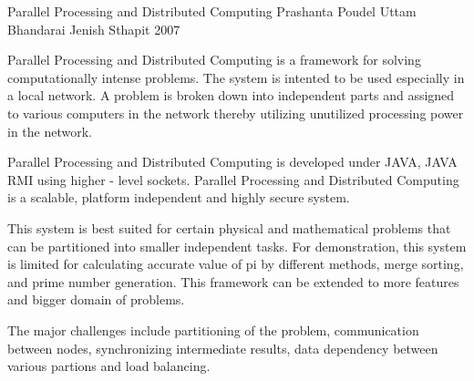  \begin{conf-abstract}[]
{Parallel Processing and Distributed Computing }
{
           Prashanta Poudel
           Uttam Bhandarai
           Jenish Sthapit
}
{ 2007 }

Parallel Processing and Distributed Computing is a framework for solving computationally intense problems. The system is intented to be used especially in a local network. A problem is broken down into independent parts and assigned to various computers in the network thereby utilizing unutilized processing power in the network.

Parallel Processing and Distributed Computing is developed under JAVA, JAVA RMI using higher - level sockets. Parallel Processing and Distributed Computing is a scalable, platform independent and highly secure system.

This system is best suited for certain physical and mathematical problems that can be partitioned into smaller independent tasks. For demonstration, this system is limited for calculating accurate value of pi by different  methods, merge sorting, and prime number generation. This framework can be extended to more features and bigger domain of problems.

The major challenges include partitioning of the problem, communication between nodes, synchronizing intermediate results, data dependency between various partions and load balancing.
  \end{conf-abstract}